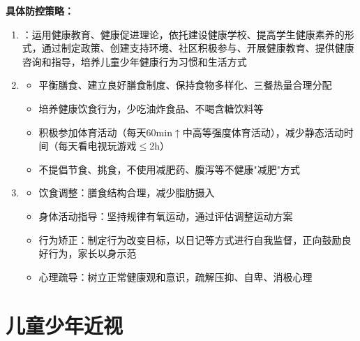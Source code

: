 \begin{keybox}
\textbf{具体防控策略：}
\begin{enumerate}[leftmargin=*]
    \item {}：运用健康教育、健康促进理论，依托建设健康学校、提高学生健康素养的形式，通过制定政策、创建支持环境、社区积极参与、开展健康教育、提供健康咨询和指导，培养儿童少年健康行为习惯和生活方式
    \item {}
    \begin{itemize}[leftmargin=*]
        \item 平衡膳食、建立良好膳食制度、保持食物多样化、三餐热量合理分配
        \item 培养健康饮食行为，少吃油炸食品、不喝含糖饮料等
        \item 积极参加体育活动（每天60min$\uparrow$中高等强度体育活动），减少静态活动时间（每天看电视玩游戏$\leq$2h）
        \item 不提倡节食、挑食，不使用减肥药、腹泻等不健康"减肥"方式
    \end{itemize}
    \item {}
    \begin{itemize}[leftmargin=*]
        \item 饮食调整：膳食结构合理，减少脂肪摄入
        \item 身体活动指导：坚持规律有氧运动，通过评估调整运动方案
        \item 行为矫正：制定行为改变目标，以日记等方式进行自我监督，正向鼓励良好行为，家长以身示范
        \item 心理疏导：树立正常健康观和意识，疏解压抑、自卑、消极心理
    \end{itemize}
\end{enumerate}
\end{keybox}

\section{儿童少年近视}


